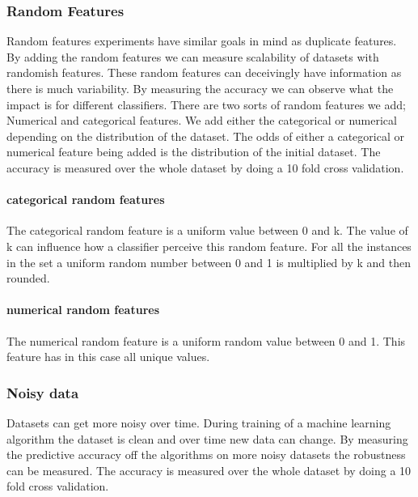 \documentclass[a4paper,10pt]{article}
\begin{document}
\subsubsection{Random Features}
Random features experiments have similar goals in mind as duplicate features. By adding the random features we can measure scalability of datasets with randomish features. These random features can deceivingly have information as there is much variability. By measuring the accuracy we can observe what the impact is for different classifiers. There are two sorts of random features we add; Numerical and categorical features. We add either the categorical or numerical depending on the distribution of the dataset. The odds of either a categorical or numerical feature being added is the distribution of the initial dataset. The accuracy is measured over the whole dataset by doing a 10 fold cross validation. %
 
\paragraph{categorical random features \newline}
The categorical random feature is a uniform value between 0 and k. The value of k can influence how a classifier perceive this random feature. For all the instances in the set a uniform random number between 0 and 1 is multiplied by k and then rounded. 
\paragraph{numerical random features \newline}
The numerical random feature is a uniform random value between 0 and 1. This feature has in this case all unique values.


\subsubsection{Noisy data}
Datasets can get more noisy over time. During training of a machine learning algorithm the dataset is clean and over time new data can change. By measuring the predictive accuracy off the algorithms on more noisy datasets the robustness can be measured. The accuracy is measured over the whole dataset by doing a 10 fold cross validation.
\end{document}
